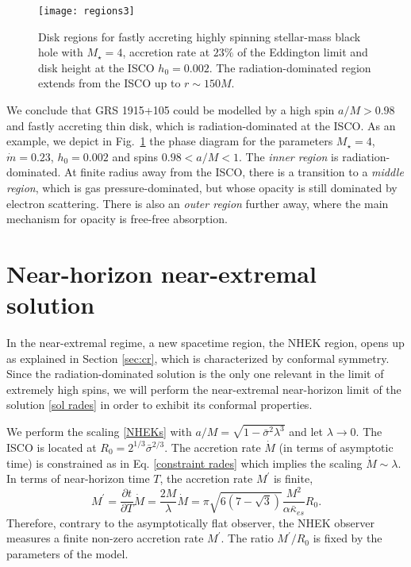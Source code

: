 \documentclass[a4paper,fleqn,usenatbib]{mnrasMOD}
\numberwithin{equation}{section}
\newcommand{\be}{\begin{equation}}
\newcommand{\ee}{\end{equation}}
\def\p{\partial}
\begin{document}
\begin{figure}
\centering
\texttt{[image: regions3]}
\caption{Disk regions for fastly accreting highly spinning stellar-mass black hole with  $M_\star = 4$, accretion rate at $23\%$ of the Eddington limit and disk height at the ISCO $h_0 = 0.002$. The radiation-dominated region extends from the ISCO up to $r \sim 150 M$.}
\label{regions3}
\end{figure}

We conclude that GRS 1915+105 could be modelled by a high spin $a/M > 0.98$ and fastly accreting thin disk, which is radiation-dominated at the ISCO. As an example, we depict in Fig.~\ref{regions3} the phase diagram for the parameters $M_\star = 4$, $\dot m =0.23$, $h_0 =0.002$ and spins $0.98 < a/M < 1$. The \emph{inner region} is radiation-dominated. At finite radius away from the ISCO, there is a transition to a \emph{middle region}, which is gas pressure-dominated, but whose opacity is still dominated by electron scattering. There is also an \emph{outer region} further away, where the main mechanism for opacity is free-free absorption. 




\section{Near-horizon near-extremal solution}
\label{NHEK sol}


In the near-extremal regime, a new spacetime region, the NHEK region, opens up as explained in Section \ref{sec:cr}, which is characterized by conformal symmetry. Since the radiation-dominated solution is the only one relevant in the limit of extremely high spins, we will perform the near-extremal near-horizon limit of the solution \eqref{sol rades} in order to exhibit its conformal  properties. 

We perform the scaling \eqref{NHEKs} with $a/M=\sqrt{1-\bar\sigma^2 \lambda^3}$ and let $\lambda \rightarrow 0$. The ISCO is located at $R_{0}=2^{1/3} \bar{\sigma}^{2/3}$. The accretion rate $\dot M$ (in terms of asymptotic time) is constrained as in Eq. \eqref{constraint rades} which implies the scaling $\dot M \sim \lambda$. In terms of near-horizon time $T$, the accretion rate $M^{\prime}$ is finite,
\be \label{constraint rades NHEK}
M^{\prime} = \frac{\p t}{\p T} \dot{M} = \frac{2M}{\lambda}\dot{M} = \pi \sqrt{6(7-\sqrt{3})}\frac{M^2}{\alpha \bar{\kappa}_{es}} R_{0}.
\ee
Therefore, contrary to the asymptotically flat observer, the NHEK observer measures a finite non-zero accretion rate $M^{\prime}$. The ratio $M^{\prime}/R_0$ is fixed by the parameters of the model. 
\end{document}
